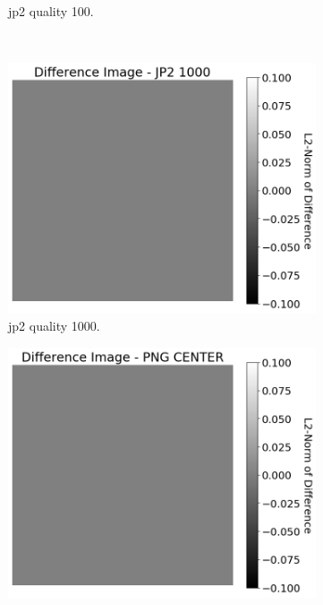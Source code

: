 \begin{figure}[htb]
\begin{subfigure}[b]{0.42\textwidth}
            \caption{\gls{jp2} quality 100.}
            \label{fig:img_quality_center_heatmap_rel_100}
        \end{subfigure}
        \\
        \begin{subfigure}[b]{0.42\textwidth}
            \centering
            \includegraphics[width=\textwidth]{doc/thesis/0_figures/compare_quality/set1/jp2_1000_center_diff_heatmap_rel.png}
            \caption{\gls{jp2} quality 1000.}
            \label{fig:img_quality_center_heatmap_rel_1000}
        \end{subfigure}
        \begin{subfigure}[b]{0.42\textwidth}
            \centering
            \includegraphics[width=\textwidth]{doc/thesis/0_figures/compare_quality/set1/png_center_diff_heatmap_rel.png}

\end{subfigure}
\end{figure}
